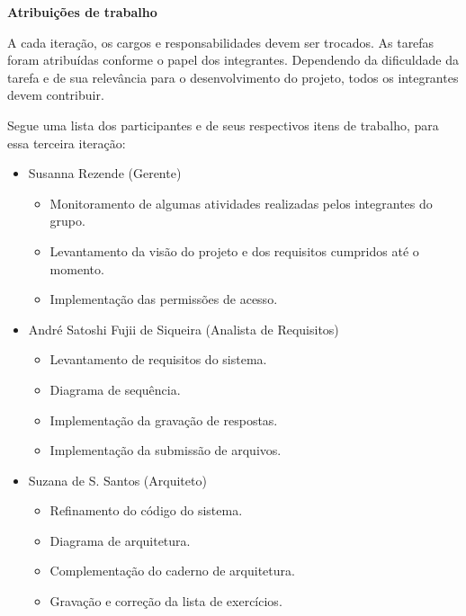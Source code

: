 \documentclass[12pt,letterpaper]{article}
\begin{document}
\vspace{1cm}
{\large {\bf Atribuições de trabalho}}
\vspace{0.5cm}

A cada iteração, os cargos e responsabilidades devem ser trocados. As tarefas foram atribuídas conforme o papel dos integrantes. Dependendo da dificuldade da tarefa e de sua relevância para o desenvolvimento do projeto, todos os integrantes devem contribuir.

Segue uma lista dos participantes e de seus respectivos itens de trabalho, para essa terceira iteração: 

\begin{itemize}


\item {}Susanna Rezende (Gerente)\\
\vspace{-0.5cm}
\begin{itemize}
\item{}Monitoramento de algumas atividades realizadas pelos integrantes do grupo.\\
\item{}Levantamento da visão do projeto e dos requisitos cumpridos até o momento.\\
\item{}Implementação das permissões de acesso.
\end{itemize}
\vspace{0.5cm}

\item {}André Satoshi Fujii de Siqueira (Analista de Requisitos)\\
\vspace{-0.5cm}
\begin{itemize}
\item{}Levantamento de requisitos do sistema.\\
\item{}Diagrama de sequência.\\
\item{}Implementação da gravação de respostas.\\
\item{}Implementação da submissão de arquivos.
\end{itemize}
\vspace{0.5cm}

\item {}Suzana de S. Santos (Arquiteto)\\
\vspace{-0.5cm}
\begin{itemize}
\item{}Refinamento do código do sistema.\\
\item{}Diagrama de arquitetura.\\
\item{}Complementação do caderno de arquitetura.\\
\item{}Gravação e correção da lista de exercícios.
\end{itemize}
\vspace{0.5cm}


\end{itemize}
\end{document}
